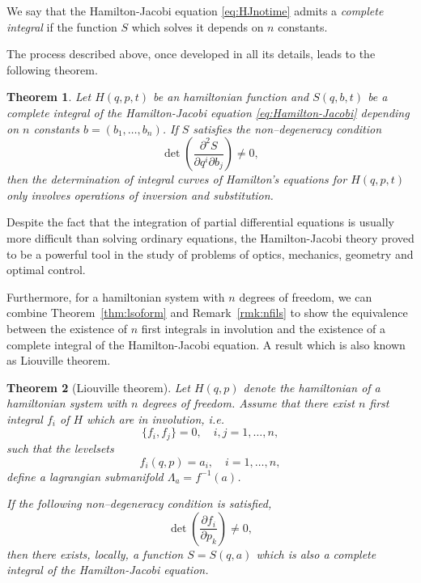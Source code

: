 \documentclass[english,fontsize=11pt,paper=b5]{scrbook}
\numberwithin{equation}{chapter}
\newtheorem{theorem}{Theorem}[chapter]
\theoremstyle{definition}
\begin{document}
    \begin{tcolorbox}
      We say that the Hamilton-Jacobi equation \eqref{eq:HJnotime} admits a \emph{complete integral} if the function $S$ which solves it depends on $n$ constants.
    \end{tcolorbox}


    The process described above, once developed in all its details, leads to the following theorem.

    \begin{theorem}
      Let $H(q,p,t)$ be an hamiltonian function and $S(q,b,t)$ be a complete integral of the Hamilton-Jacobi equation \eqref{eq:Hamilton-Jacobi} depending on $n$ constants $b=(b_1,\ldots,b_n)$. If $S$ satisfies the non--degeneracy condition
      \begin{equation}
        \det\left(\frac{\partial^2 S}{\partial q^i \partial b_j}\right) \neq 0,
      \end{equation}
      then the determination of integral curves of Hamilton's equations for $H(q,p,t)$ only involves operations of inversion and substitution.
    \end{theorem}

    Despite the fact that the integration of partial differential equations is usually more difficult than solving ordinary equations, the Hamilton-Jacobi theory proved to be a powerful tool in the study of problems of optics, mechanics, geometry and optimal control.

    Furthermore, for a hamiltonian system with $n$ degrees of freedom, we can combine Theorem~\ref{thm:lsoform} and Remark~\ref{rmk:nfils} to show the equivalence between the existence of $n$ first integrals in involution and the existence of a complete integral of the Hamilton-Jacobi equation.
    A result which is also known as Liouville theorem.

    \begin{theorem}[Liouville theorem]
      Let $H(q,p)$ denote the hamiltonian of a hamiltonian system with $n$ degrees of freedom.
      Assume that there exist $n$ first integral $f_i$ of $H$ which are in involution, i.e.
      \begin{equation}
        \big\{ f_i, f_j\big\} = 0, \quad i,j = 1,\ldots, n,
      \end{equation}
      such that the levelsets
      \begin{equation}
        f_i(q,p) = a_i, \quad i=1,\ldots,n,
      \end{equation}
      define a lagrangian submanifold $\Lambda_a = f^{-1}(a)$.

      If the following non--degeneracy condition is satisfied,
      \begin{equation}
        \det\left(\frac{\partial f_i}{\partial p_k}\right)\neq 0,
      \end{equation}
      then there exists, locally, a function $S=S(q,a)$ which is also a complete integral of the Hamilton-Jacobi equation.
    \end{theorem}
\end{document}
